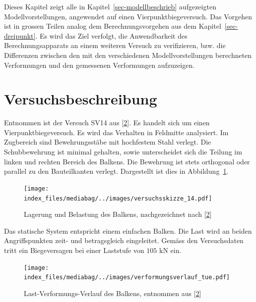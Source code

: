 \documentclass[
  12pt,
  letterpaper,
  egregdoesnotlikesansseriftitles]{scrreprt}
\begin{document}
Dieses Kapitel zeigt alle in Kapitel~\ref{sec-modellbeschrieb}
aufgezeigten Modellvorstellungen, angewendet auf einen
Vierpunktbiegeversuch. Das Vorgehen ist in grossen Teilen analog dem
Berechnungsvorgehen aus dem Kapitel~\ref{sec-dreipunkt}. Es wird das
Ziel verfolgt, die Anwendbarkeit des Berechnungsapparats an einem
weiteren Versuch zu verifizieren, bzw. die Differenzen zwischen den mit
den verschiedenen Modellvorstellungen berechneten Verformungen und den
gemessenen Verformungen aufzuzeigen.

\hypertarget{versuchsbeschreibung-1}{%
\section{Versuchsbeschreibung}\label{versuchsbeschreibung-1}}

Entnommen ist der Versuch SV14 aus
{[}\protect\hyperlink{ref-Tue2019}{2}{]}. Es handelt sich um einen
Vierpunktbiegeversuch. Es wird das Verhalten in Feldmitte analysiert. Im
Zugbereich sind Bewehrungsstäbe mit hochfestem Stahl verlegt. Die
Schubbewehrung ist minimal gehalten, sowie unterscheidet sich die
Teilung im linken und rechten Bereich des Balkens. Die Bewehrung ist
stets orthogonal oder parallel zu den Bauteilkanten verlegt. Dargestellt
ist dies in Abbildung~\ref{fig-system_sv14}.

\begin{figure}[H]

{\centering \texttt{[image: index\_files/mediabag/../images/versuchsskizze\_14.pdf]}

}

\caption{\label{fig-system_sv14}Lagerung und Belastung des Balkens,
nachgezeichnet nach {[}\protect\hyperlink{ref-Tue2019}{2}{]}}

\end{figure}

Das statische System entspricht einem einfachen Balken. Die Last wird an
beiden Angriffspunkten zeit- und betragsgleich eingeleitet. Gemäss den
Versuchsdaten tritt ein Biegeversagen bei einer Laststufe von
\(105 \text{ kN}\) ein.

\begin{figure}[H]

{\centering \texttt{[image: index\_files/mediabag/../images/verformungsverlauf\_tue.pdf]}

}

\caption{\label{fig-last_verformung_sv14}Last-Verformungs-Verlauf des
Balkens, entnommen aus {[}\protect\hyperlink{ref-Tue2019}{2}{]}}

\end{figure}
\end{document}
